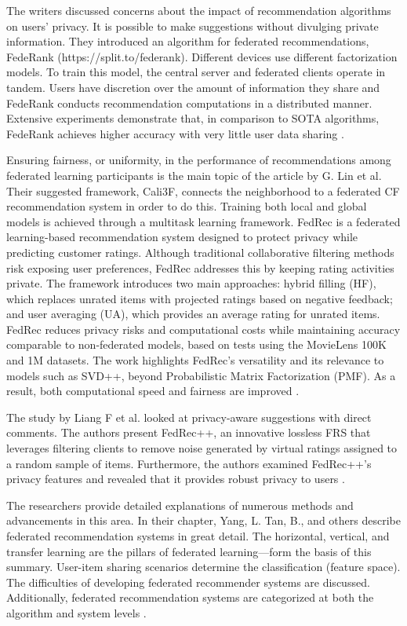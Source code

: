 The writers discussed concerns about the impact of recommendation algorithms on users' privacy. It is possible to make suggestions without divulging private information. They introduced an algorithm for federated recommendations, FedeRank (https://split.to/federank). Different devices use different factorization models. To train this model, the central server and federated clients operate in tandem. Users have discretion over the amount of information they share and FedeRank conducts recommendation computations in a distributed manner. Extensive experiments demonstrate that, in comparison to SOTA algorithms, FedeRank achieves higher accuracy with very little user data sharing \cite{ref23}.

Ensuring fairness, or uniformity, in the performance of recommendations among federated learning participants is the main topic of the article by G. Lin et al. Their suggested framework, Cali3F, connects the neighborhood to a federated CF recommendation system in order to do this. Training both local and global models is achieved through a multitask learning framework. FedRec is a federated learning-based recommendation system designed to protect privacy while predicting customer ratings. Although traditional collaborative filtering methods risk exposing user preferences, FedRec addresses this by keeping rating activities private. The framework introduces two main approaches: hybrid filling (HF), which replaces unrated items with projected ratings based on negative feedback; and user averaging (UA), which provides an average rating for unrated items. FedRec reduces privacy risks and computational costs while maintaining accuracy comparable to non-federated models, based on tests using the MovieLens 100K and 1M datasets. The work highlights FedRec's versatility and its relevance to models such as SVD++, beyond Probabilistic Matrix Factorization (PMF). As a result, both computational speed and fairness are improved \cite{ref24}.

The study by Liang F et al. looked at privacy-aware suggestions with direct comments. The authors present FedRec++, an innovative lossless FRS that leverages filtering clients to remove noise generated by virtual ratings assigned to a random sample of items. Furthermore, the authors examined FedRec++'s privacy features and revealed that it provides robust privacy to users\cite{ref25} .

The researchers provide detailed explanations of numerous methods and advancements in this area. In their chapter, Yang, L. Tan, B., and others describe federated recommendation systems in great detail. The horizontal, vertical, and transfer learning are the pillars of federated learning---form the basis of this summary. User-item sharing scenarios determine the classification (feature space). The difficulties of developing federated recommender systems are discussed. Additionally, federated recommendation systems are categorized at both the algorithm and system levels \cite{ref12}.

